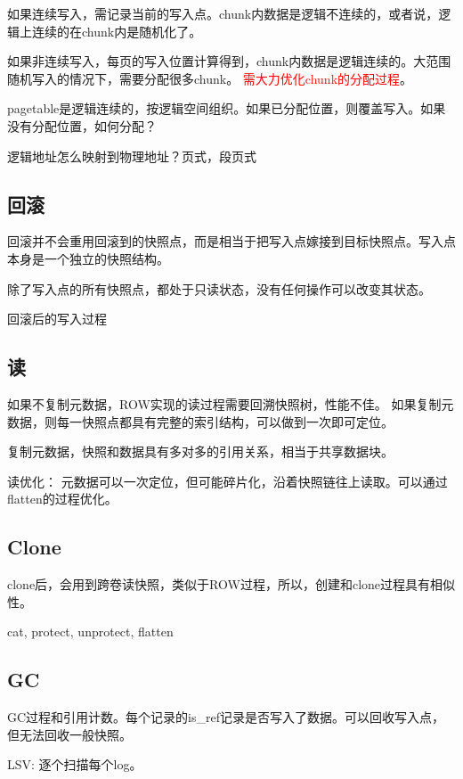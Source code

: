 如果连续写入，需记录当前的写入点。chunk内数据是逻辑不连续的，或者说，逻辑上连续的在chunk内是随机化了。

如果非连续写入，每页的写入位置计算得到，chunk内数据是逻辑连续的。大范围随机写入的情况下，需要分配很多chunk。
\textcolor{red}{需大力优化chunk的分配过程}。

pagetable是逻辑连续的，按逻辑空间组织。如果已分配位置，则覆盖写入。如果没有分配位置，如何分配？

逻辑地址怎么映射到物理地址？页式，段页式

\subsection{回滚}

回滚并不会重用回滚到的快照点，而是相当于把写入点嫁接到目标快照点。写入点本身是一个独立的快照结构。

除了写入点的所有快照点，都处于只读状态，没有任何操作可以改变其状态。

回滚后的写入过程

\subsection{读}

如果不复制元数据，ROW实现的读过程需要回溯快照树，性能不佳。
如果复制元数据，则每一快照点都具有完整的索引结构，可以做到一次即可定位。

复制元数据，快照和数据具有多对多的引用关系，相当于共享数据块。

读优化： 元数据可以一次定位，但可能碎片化，沿着快照链往上读取。可以通过flatten的过程优化。

\subsection{Clone}

clone后，会用到跨卷读快照，类似于ROW过程，所以，创建和clone过程具有相似性。

cat, protect, unprotect, flatten

\subsection{GC}

GC过程和引用计数。每个记录的is\_ref记录是否写入了数据。可以回收写入点，但无法回收一般快照。

LSV: 逐个扫描每个log。

